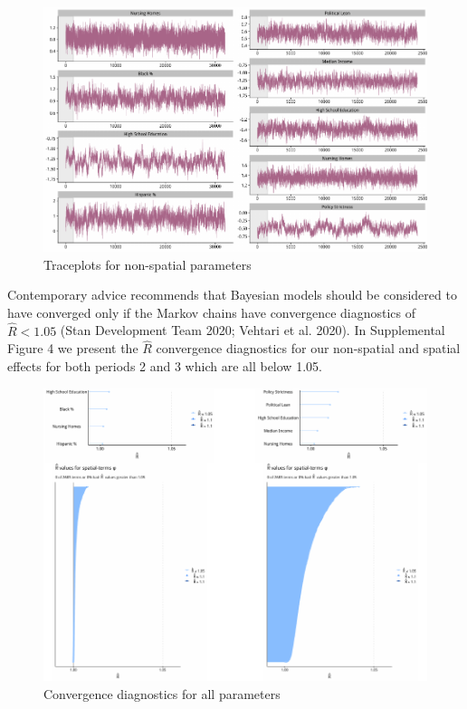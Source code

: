 \documentclass[
]{article}
\begin{document}
\begin{figure}

{\centering \includegraphics[width=0.6\linewidth,height=0.25\textheight]{supplement_files/figure-latex/unnamed-chunk-3-1} 

}

\caption{Traceplots for non-spatial parameters}\label{fig:unnamed-chunk-3}
\end{figure}

Contemporary advice recommends that Bayesian models should be considered
to have converged only if the Markov chains have convergence diagnostics
of \(\hat{R} < 1.05\) (Stan Development Team 2020; Vehtari et al. 2020).
In Supplemental Figure 4 we present the \(\hat{R}\) convergence
diagnostics for our non-spatial and spatial effects for both periods 2
and 3 which are all below 1.05.

\begin{figure}

{\centering \includegraphics[width=1\linewidth,height=0.4\textheight]{supplement_files/figure-latex/unnamed-chunk-4-1} 

}

\caption{Convergence diagnostics for all parameters}\label{fig:unnamed-chunk-4}
\end{figure}
\end{document}
